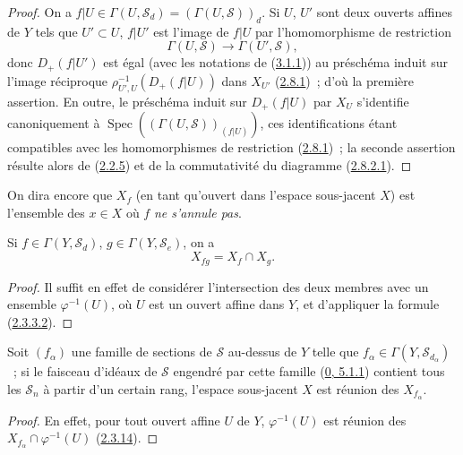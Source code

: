 \begin{proof}
On a $f|U\in\Gamma(U,\mathcal{S}_d)=(\Gamma(U,\mathcal{S}))_d$. Si $U$,
$U'$ sont deux ouverts affines de $Y$ tels que $U'\subset U$, $f|U'$ est
l'image de $f|U$ par l'homomorphisme de restriction
\[
  \Gamma(U,\mathcal{S})\longrightarrow\Gamma(U',\mathcal{S}),
\]
donc $D_+(f|U')$ est égal (avec les notations de
(\hyperref[II.3.1.1-fr]{3.1.1})) au préschéma induit sur l'image réciproque
$\rho_{U',U}^{-1}(D_+(f|U))$ dans $X_{U'}$
(\hyperref[II.2.8.1-fr]{2.8.1})~; d'où la première assertion. En outre, le
préschéma induit sur $D_+(f|U)$ par $X_U$ s'identifie canoniquement à
$\operatorname{Spec}((\Gamma(U,\mathcal{S}))_{(f|U)})$, ces identifications
étant compatibles avec les homomorphismes de restriction
(\hyperref[II.2.8.1-fr]{2.8.1})~; la seconde assertion résulte alors de
(\hyperref[II.2.2.5-fr]{2.2.5}) et de la commutativité du diagramme
(\hyperref[II.2.8.2.1-fr]{2.8.2.1}).
\end{proof}

On dira encore que $X_f$ (en tant qu'ouvert dans l'espace sous-jacent $X$)
est l'ensemble des $x\in X$ où $f$ \emph{ne s'annule pas}.

\begin{corollary}[3.1.5]
\label{II.3.1.5-fr}
Si $f\in\Gamma(Y,\mathcal{S}_d)$, $g\in\Gamma(Y,\mathcal{S}_e)$, on a
\[
\label{II.3.1.5.1-fr}
  X_{fg}=X_f\cap X_g.
\tag{3.1.5.1}
\]
\end{corollary}

\begin{proof}
Il suffit en effet de considérer l'intersection des deux membres avec un
ensemble $\varphi^{-1}(U)$, où $U$ est un ouvert affine dans $Y$, et
d'appliquer la formule (\hyperref[II.2.3.3.2-fr]{2.3.3.2}).
\end{proof}

\begin{corollary}[3.1.6]
\label{II.3.1.6-fr}
Soit $(f_\alpha)$ une famille de sections de $\mathcal{S}$ au-dessus de $Y$
telle que $f_\alpha\in\Gamma(Y,\mathcal{S}_{d_\alpha})$~; si le faisceau
d'idéaux de $\mathcal{S}$ engendré par cette famille
(\hyperref[0.5.1.1-fr]{0, 5.1.1}) contient tous les $\mathcal{S}_n$ à partir
d'un certain rang, l'espace sous-jacent $X$ est réunion des $X_{f_\alpha}$.
\end{corollary}

\begin{proof}
En effet, pour tout ouvert affine $U$ de $Y$, $\varphi^{-1}(U)$ est réunion
des $X_{f_\alpha}\cap\varphi^{-1}(U)$
(\hyperref[II.2.3.14-fr]{2.3.14}).
\end{proof}

